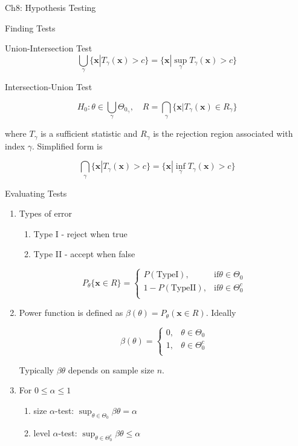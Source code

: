 \documentclass{article}
\newcommand{\bo}[1]{\boldsymbol{#1}}
\begin{document}
\begin{section}{Ch8: Hypothesis Testing}
\begin{subsection}{Finding Tests}
\begin{subsubsection}{Union-Intersection Test}
\[ \bigcup_{\gamma} \{ \bo{x} | T_{\gamma}(\bo{x}) > c \} =
  \{ \bo{x} | \sup_{\gamma} T_{\gamma}(\bo{x}) > c \} \]
\end{subsubsection}

\begin{subsubsection}{Intersection-Union Test}

\[H_{0} : \theta \in \bigcup_{\gamma} \Theta_{0_{\gamma}} , \quad 
R = \bigcap_{\gamma} \{ \bo{x} | T_{\gamma}(\bo{x}) \in R_{\gamma} \} \]

\noindent where $T_{\gamma}$ is a sufficient statistic and $R_{\gamma}$ is
the rejection region associated with index $\gamma$. Simplified form is

\[ \bigcap_{\gamma} \{ \bo{x} | T_{\gamma}(\bo{x}) > c \} =
  \{ \bo{x} | \inf_{\gamma} T_{\gamma}(\bo{x}) > c \} \]
\end{subsubsection}
\end{subsection}

\begin{subsection}{Evaluating Tests}
\begin{enumerate}
\item Types of error
  \begin{enumerate}
  \item Type I - reject when true
  \item Type II - accept when false
  \end{enumerate}

  \[ P_{\theta}\{\bo{x} \in R\} = 
    \begin{cases}
      P(\mathrm{Type I}), & \mathrm{if} \theta \in \Theta_{0}\\
      1 - P(\mathrm{Type II}), & \mathrm{if} \theta \in \Theta_{0}^{c}\\
    \end{cases} \]

\item Power function is defined as $\beta(\theta) = P_{\theta}(\bo{x} \in R)$.
Ideally

\[ \beta(\theta) = 
  \begin{cases}
  0, & \theta \in \Theta_{0}\\
  1, & \theta \in \Theta_{0}^{c}\\
  \end{cases} \]

Typically $\beta{\theta}$ depends on sample size $n$.

\item For $0 \leq \alpha \leq 1$
  \begin{enumerate}
  \item size $\alpha$-test: $\sup_{\theta \in \Theta_{0}} \beta{\theta} = 
     \alpha$
  \item level $\alpha$-test: $\sup_{\theta \in \Theta_{0}^{c}}
    \beta{\theta} \leq \alpha$
  \end{enumerate}


\end{enumerate}
\end{subsection}
\end{section}
\end{document}
